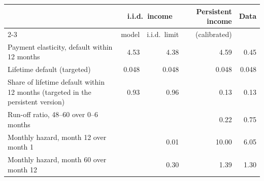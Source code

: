 \begin{tabular}{lrrrr}
\toprule
 & \multicolumn{2}{c}{i.i.d.\ income} & Persistent income & Data \\
\cmidrule(lr){2-3}
 & model & i.i.d.\ limit & (calibrated) & \\
\midrule
Payment elasticity, default within 12 months & 4.53 & 4.38 & 4.59 & 0.45 \\
Lifetime default (targeted) & 0.048 & 0.048 & 0.048 & 0.048 \\
Share of lifetime default within 12 months (targeted in the persistent version) & 0.93 & 0.96 & 0.13 & 0.13 \\
Run-off ratio, 48--60 over 0--6 months &  &  & 0.22 & 0.75 \\
Monthly hazard, month 12 over month 1 &  & 0.01 & 10.00 & 6.05 \\
Monthly hazard, month 60 over month 12 &  & 0.30 & 1.39 & 1.30 \\
\bottomrule
\end{tabular}
